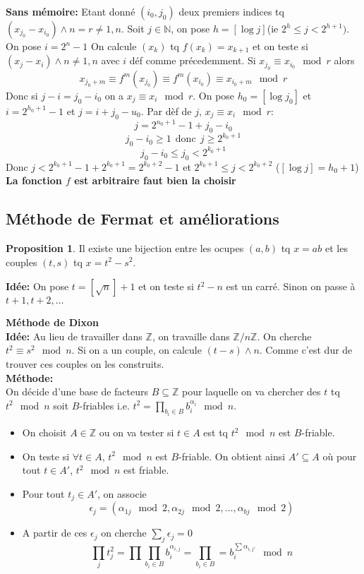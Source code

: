 \documentclass[12pt]{article}
\theoremstyle{plain}
\theoremstyle{definition}
\newtheorem{prop}[subsubsection]{Proposition}
\newcommand{\Z}{\mathbb{Z}}
\newcommand{\N}{\mathbb{N}}
\begin{document}
\textbf{Sans mémoire:} Etant donné $(i_0,j_0)$ deux premiers 
indices tq $(x_{j_0}-x_{i_0})\wedge n=r\ne1,n$. Soit $j\in\N$, on
pose $h=[\log j]$(ie $2^h\leq j<2^{h+1})$. On pose $i=2^n-1$
\indent On calcule $(x_k)$ tq $f(x_k)=x_{k+1}$ et on teste 
si $(x_j-x_i)\wedge n\ne1,n$ avec $i$ déf comme précedemment.
Si $x_{j_0}\equiv x_{i_0}\mod r$ alors \[
    x_{j_0+m}\equiv f^m(x_{j_0})\equiv f^m(x_{i_0})\equiv 
    x_{i_0+m}\mod r
    \]
Donc si $j-i=j_0-i_0$ on a $x_j\equiv x_i\mod r$. On pose 
$h_0=[\log j_0]$ et $i=2^{h_0+1}-1$ et $j=i+j_0-u_0$. Par 
dèf de $j$, $x_j\equiv x_i\mod r$: \[
    j=2^{n_0+1}-1 +j_0-i_0
\]
\[
    j_0-i_0\geq 1~~\text{donc}~~j\geq 2^{k_0+1}
\]
\[
    j_0-i_0\leq j_0<2^{k_0+1}
\]
Donc $j<2^{k_0+1}-1+2^{k_0+1}=2^{k_0+2}-1$ et 
$2^{k_0+1}\leq j<2^{k_0+2}$ ($[\log j]=h_0+1$)\\
\newline
\indent \textbf{La fonction $f$ est arbitraire faut bien
 la choisir}

\subsection{Méthode de Fermat et améliorations}
\begin{prop}
    Il existe une bijection entre les ocupes $(a,b)$ tq 
    $x=ab$ et les couples $(t,s)$ tq $x=t^2-s^2$.
\end{prop}

\textbf{Idée:} On pose $t=[\sqrt{n}]+1$ et on teste si 
$t^2-n$ est un carré. Sinon on passe à $t+1,t+2,\ldots$

\textbf{Méthode de Dixon}\\
\textbf{Idée:} Au lieu de travailler dans $\Z$, on travaille
dans $\Z/n\Z$. On cherche $t^2\equiv s^2\mod n$. Si on 
a un couple, on calcule $(t-s)\wedge n$. Comme c'est dur 
de trouver ces couples on les construits.\\
\textbf{Méthode:}\\
On décide d'une base de facteurs $B\subseteq\Z$  pour 
laquelle on va chercher des $t$ tq $t^2\mod n$ soit 
$B$-friables i.e. $t^2=\prod_{b_i\in B}b_i^{\alpha_i}\mod n$.
\begin{itemize}
    \item On choisit $A\in\Z$ ou on va tester si $t\in A$ est tq 
$t^2\mod n$ est $B$-friable.
    \item On teste si $\forall t\in A$, $t^2\mod n$ est 
$B$-friable. On obtient ainsi $A'\subseteq A$ où pour 
tout $t\in A'$, $t^2\mod n$ est friable.
    \item Pour tout $t_j\in A'$, on associe \[
        \epsilon_j=(\alpha_{1j}\mod 2, \alpha_{2j}\mod 2,
        \ldots,\alpha_{bj}\mod 2)
    \]
    \item A partir de ces $\epsilon_j$ on cherche $\sum_j \epsilon_j=0$
    \[
        \prod_j t_j^2=\prod\prod_{b_i\in B}b_i^{\alpha_{i,j}}
        =\prod_{b_i\in B}=b_i^{\sum \alpha_{i,j'}}\mod n
    \]
\end{itemize}
\end{document}

